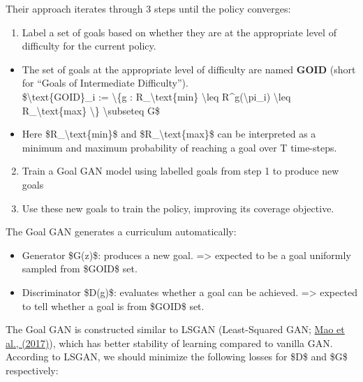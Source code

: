 Their approach iterates through 3 steps until the policy converges:

\begin{enumerate}
\tightlist
\item
  Label a set of goals based on whether they are at the appropriate level of difficulty for the current policy.
\end{enumerate}

\begin{itemize}
\tightlist
\item
  The set of goals at the appropriate level of difficulty are named \textbf{GOID} (short for ``Goals of Intermediate Difficulty'').\\
  \$\textbackslash text\{GOID\}\_i := \textbackslash\{g : R\_\textbackslash text\{min\} \textbackslash leq R\^{}g(\textbackslash pi\_i) \textbackslash leq R\_\textbackslash text\{max\} \textbackslash\} \textbackslash subseteq G\$
\item
  Here \$R\_\textbackslash text\{min\}\$ and \$R\_\textbackslash text\{max\}\$ can be interpreted as a minimum and maximum probability of reaching a goal over T time-steps.
\end{itemize}

\begin{enumerate}
\setcounter{enumi}{1}
\tightlist
\item
  Train a Goal GAN model using labelled goals from step 1 to produce new goals
\item
  Use these new goals to train the policy, improving its coverage objective.
\end{enumerate}

The Goal GAN generates a curriculum automatically:

\begin{itemize}
\tightlist
\item
  Generator \$G(z)\$: produces a new goal. =\textgreater{} expected to be a goal uniformly sampled from \$GOID\$ set.
\item
  Discriminator \$D(g)\$: evaluates whether a goal can be achieved. =\textgreater{} expected to tell whether a goal is from \$GOID\$ set.
\end{itemize}

The Goal GAN is constructed similar to LSGAN (Least-Squared GAN; \href{https://arxiv.org/abs/1611.04076}{Mao et al., (2017)}), which has better stability of learning compared to vanilla GAN. According to LSGAN, we should minimize the following losses for \$D\$ and \$G\$ respectively:

